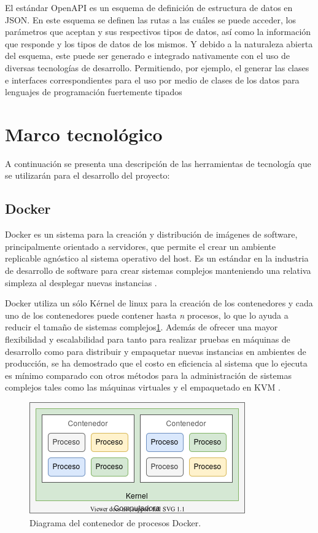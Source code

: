 El estándar OpenAPI es un esquema de definición de estructura de datos en JSON. En este esquema se definen las rutas a las cuáles se puede acceder, los parámetros que aceptan y sus respectivos tipos de datos, así como la información que responde y los tipos de datos de los mismos. Y debido a la naturaleza abierta del esquema, este puede ser generado e integrado nativamente con el uso de diversas tecnologías de desarrollo. Permitiendo, por ejemplo, el generar las clases e interfaces correspondientes para el uso por medio de clases de los datos para lenguajes de programación fuertemente tipados \cite{openapi_generator}

\section{Marco tecnológico}

A continuación se presenta una descripción de las herramientas de tecnología que se utilizarán para el desarrollo del proyecto:

\subsection{Docker}

Docker es un sistema para la creación y distribución de imágenes de software, principalmente orientado a servidores, que permite el crear un ambiente replicable agnóstico al sistema operativo del host. Es un estándar en la industria de desarrollo de software para crear sistemas complejos manteniendo una relativa simpleza al desplegar nuevas instancias \cite{rad2017dockerAnalysis}.

Docker utiliza un sólo Kérnel de linux para la creación de los contenedores y cada uno de los contenedores puede contener hasta \textit{n} procesos, lo que lo ayuda a reducir el tamaño de sistemas complejos\ref{fig:docker_diagrama}. Además de ofrecer una mayor flexibilidad y escalabilidad para tanto para realizar pruebas en máquinas de desarrollo como para distribuir y empaquetar nuevas instancias en ambientes de producción, se ha demostrado que el costo en eficiencia al sistema que lo ejecuta es mínimo comparado con otros métodos para la administración de sistemas complejos tales como las máquinas virtuales y el empaquetado en KVM \cite{rad2017dockerAnalysis, felter2015comparsionPerformance}.


\begin{figure}[!ht]
	\centering
	\includegraphics[width=.45\linewidth]{images/diagrams/docker.png}
	\caption{Diagrama del contenedor de procesos Docker.}
	\label{fig:docker_diagrama}
\end{figure}

